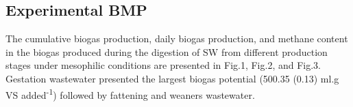 \subsection{Experimental BMP}
The cumulative biogas production, daily biogas production, and methane content in the biogas produced during the digestion of SW from different production stages under mesophilic conditions are presented in Fig.1, Fig.2, and Fig.3. Gestation wastewater presented the largest biogas potential (500.35 (0.13) ml.g VS added\textsuperscript{-1}) followed by fattening and weaners wastewater. 